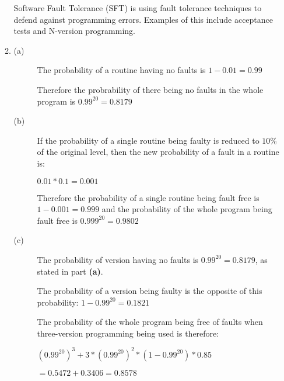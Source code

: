 \documentclass[a4paper,12pt]{article}
\begin{document}
\begin{enumerate}
\begin{enumerate}
                Software Fault Tolerance (SFT) is using fault tolerance techniques to defend against programming errors. Examples of this include acceptance tests and N-version programming.

                \item
                    \begin{description}
                        \item[(a)] The probability of a routine having no faults is $1 - 0.01 = 0.99$

                        Therefore the probrability of there being no faults in the whole program is $0.99^{20} = 0.8179$

                        \item[(b)] If the probability of a single routine being faulty is reduced to $10\%$ of the original level, then the new probability of a fault in a routine is:

                        $0.01 * 0.1 = 0.001$

                        Therefore the probability of a single routine being fault free is $1 - 0.001 = 0.999$ and the probability of the whole program being fault free is $0.999^{20} = 0.9802$

                        \item[(c)] The probability of version having no faults is $0.99^{20} = 0.8179$, as stated in part \textbf{(a)}.

                        The probability of a version being faulty is the opposite of this probability: $1 - 0.99^{20} = 0.1821$

                        The probability of the whole program being free of faults when three-version programming being used is therefore:

                        $(0.99^{20})^3 + 3 * (0.99^{20})^2 * (1 - 0.99^{20}) * 0.85$

                        $= 0.5472 + 0.3406 = 0.8578$
                    \end{description}
            \end{enumerate}

    \end{enumerate}
\end{document}
